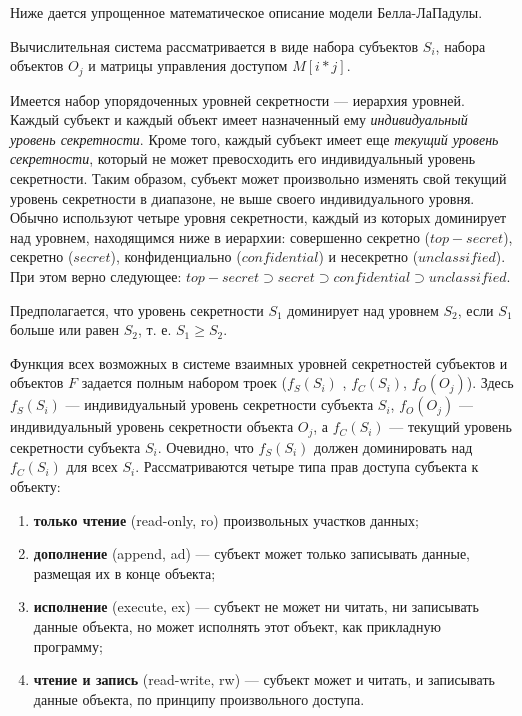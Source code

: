 Ниже дается упрощенное математическое описание модели Белла-ЛаПадулы.

Вычислительная система рассматривается в виде набора субъектов $S_{i}$, набора объектов $O_{j}$ и матрицы управления доступом $M[i*j]$.

Имеется набор упорядоченных уровней секретности --- иерархия уровней. Каждый субъект и каждый объект имеет назначенный ему \textit{индивидуальный уровень секретности}. Кроме того, каждый субъект имеет еще \textit{текущий уровень секретности}, который не может превосходить его индивидуальный уровень секретности. Таким образом, субъект может произвольно изменять свой текущий уровень секретности в диапазоне, не выше своего индивидуального уровня. Обычно используют четыре уровня секретности, каждый из которых доминирует над уровнем, находящимся ниже в иерархии: совершенно секретно ($top-secret$),  секретно ($secret$),  конфиденциально ($confidential$) и несекретно ($unclassified$).  При этом верно следующее: $ top-secret \supset secret \supset confidential \supset unclassified $.

Предполагается, что уровень секретности $S_1$ доминирует над уровнем $S_2$, если $S_1$ больше или равен $S_2$, т. е. $S_1 \geq S_2$.

Функция всех возможных в системе взаимных уровней секретностей субъектов и объектов $F$ задается полным набором троек ($f_S(S_i)$ , $f_C(S_i)$, $f_O(O_j)$). Здесь $f_S(S_i)$ --- индивидуальный уровень секретности субъекта $S_i$, $f_O(O_j)$ --- индивидуальный уровень секретности объекта $O_j$, а $f_C(S_i)$ --- текущий уровень секретности субъекта $S_i$. Очевидно, что $f_S(S_i)$ должен доминировать над $f_C(S_i)$ для всех $S_i$. Рассматриваются четыре типа прав доступа субъекта к объекту:

\begin{enumerate}
	\item\textbf{только чтение} (read-only, ro) произвольных участков данных;
	\item\textbf{дополнение} (append, ad) --- субъект может только записывать данные, размещая их в конце объекта;
	\item\textbf{исполнение} (execute, ex) --- субъект не может ни читать, ни записывать данные объекта, но может исполнять этот объект, как прикладную программу;
	\item\textbf{чтение и запись} (read-write, rw) --- субъект может и читать, и записывать данные объекта, по принципу произвольного доступа.
\end{enumerate}

